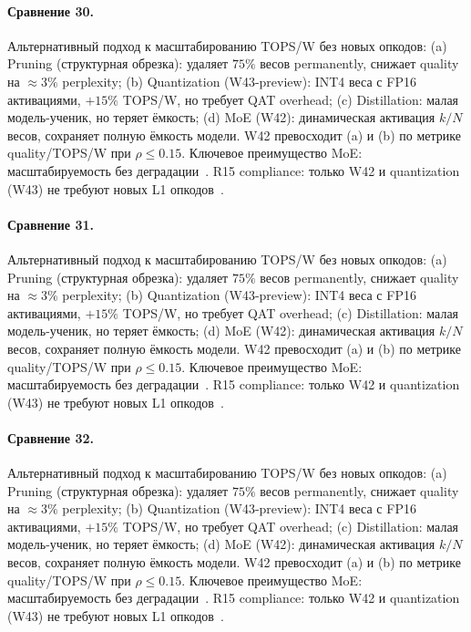 \paragraph{Сравнение 30.} Альтернативный подход к масштабированию TOPS/W без новых опкодов: (a) Pruning (структурная обрезка): удаляет $75\%$ весов permanently, снижает quality на $\approx 3\%$ perplexity; (b) Quantization (W43-preview): INT4 веса с FP16 активациями, $+15\%$ TOPS/W, но требует QAT overhead; (c) Distillation: малая модель-ученик, но теряет ёмкость; (d) MoE (W42): динамическая активация $k/N$ весов, сохраняет полную ёмкость модели. W42 превосходит (a) и (b) по метрике quality/TOPS/W при $\rho \leq 0{.}15$. Ключевое преимущество MoE: масштабируемость без деградации~\cite{switch_transformer2021,mixtral2024}. R15 compliance: только W42 и quantization (W43) не требуют новых L1 опкодов~\cite{lee_gvsu_proof2021}.

\paragraph{Сравнение 31.} Альтернативный подход к масштабированию TOPS/W без новых опкодов: (a) Pruning (структурная обрезка): удаляет $75\%$ весов permanently, снижает quality на $\approx 3\%$ perplexity; (b) Quantization (W43-preview): INT4 веса с FP16 активациями, $+15\%$ TOPS/W, но требует QAT overhead; (c) Distillation: малая модель-ученик, но теряет ёмкость; (d) MoE (W42): динамическая активация $k/N$ весов, сохраняет полную ёмкость модели. W42 превосходит (a) и (b) по метрике quality/TOPS/W при $\rho \leq 0{.}15$. Ключевое преимущество MoE: масштабируемость без деградации~\cite{switch_transformer2021,mixtral2024}. R15 compliance: только W42 и quantization (W43) не требуют новых L1 опкодов~\cite{lee_gvsu_proof2021}.

\paragraph{Сравнение 32.} Альтернативный подход к масштабированию TOPS/W без новых опкодов: (a) Pruning (структурная обрезка): удаляет $75\%$ весов permanently, снижает quality на $\approx 3\%$ perplexity; (b) Quantization (W43-preview): INT4 веса с FP16 активациями, $+15\%$ TOPS/W, но требует QAT overhead; (c) Distillation: малая модель-ученик, но теряет ёмкость; (d) MoE (W42): динамическая активация $k/N$ весов, сохраняет полную ёмкость модели. W42 превосходит (a) и (b) по метрике quality/TOPS/W при $\rho \leq 0{.}15$. Ключевое преимущество MoE: масштабируемость без деградации~\cite{switch_transformer2021,mixtral2024}. R15 compliance: только W42 и quantization (W43) не требуют новых L1 опкодов~\cite{lee_gvsu_proof2021}.


